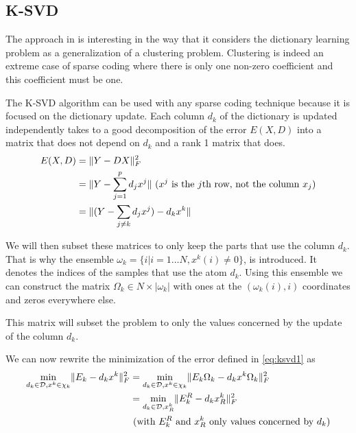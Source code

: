 \documentclass[a4paper,11pt]{article}
\DeclarePairedDelimiter\norm{\lVert}{\rVert} %
\begin{document}
\subsection{K-SVD}
The approach in \cite{aharon06} is interesting in the way that it considers the dictionary learning problem as a generalization of a clustering problem. Clustering is indeed an extreme case of sparse coding where there is only one non-zero coefficient and this coefficient must be one.

The K-SVD algorithm can be used with any sparse coding technique because it is focused on the dictionary update.
Each column $d_k$ of the dictionary is updated independently takes to a good decomposition of the error $E(X,D)$ into a matrix that does not depend on $d_k$ and a rank 1 matrix that does.
\begin{equation} \label{eq:ksvd1}
\begin{split}
  E(X,D) & = \norm{Y - DX}_F^2 \\
  		 & = \norm{Y - \sum\limits_{j=1}^{p} d_j x^j} \text{ ($x^j$ is the $j$th row, not the column $x_j$)}\\
         & = \norm{(Y - \sum\limits_{j \neq k} d_j x^j)  - d_k x^k}
\end{split}
\end{equation}

We will then subset these matrices to only keep the parts that use the column $d_k$.
That is why the ensemble $\omega_k = \{i | i = 1 \ldots N, x^k(i) \neq 0\}$, is introduced. It denotes the indices of the samples that use the atom $d_k$.
Using this ensemble we can construct the matrix $\Omega_k \in N \times |\omega_k|$ with ones at the $(\omega_k(i),i)$ coordinates and zeros everywhere else.

This matrix will subset the problem to only the values concerned by the update of the column $d_k$.

We can now rewrite the minimization of the error defined in \ref{eq:ksvd1} as
\begin{equation*}
\begin{split}
  \min_{d_k \in \mathcal{D}, x^k \in \chi_k} \norm{E_k - d_k x^k }_F^2 & = \min_{d_k \in \mathcal{D}, x^k \in \chi_k} \norm{E_k \Omega_k - d_k x^k \Omega_k}_F^2 \\
  											& = \min_{d_k \in \mathcal{D}, x^k_R} \norm{E_k^R - d_k x^k_R}_F^2 \\
                                            & \text{ (with $E_k^R$ and $x^k_R$ only values concerned by $d_k$)}
\end{split}
\end{equation*}
\end{document}
